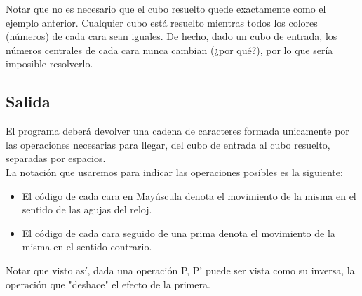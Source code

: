 \documentclass[11pt,a4paper]{article}
\begin{document}
Notar que no es necesario que el cubo resuelto quede exactamente como el ejemplo anterior. Cualquier cubo está resuelto mientras todos los colores (números) de cada cara sean iguales. 
De hecho, dado un cubo de entrada, los números centrales de cada cara nunca cambian (¿por qué?), por lo que sería imposible resolverlo. %

\subsection{Salida}
El programa deberá devolver una cadena de caracteres formada unicamente por las operaciones necesarias para llegar, del cubo de entrada al cubo resuelto, separadas por espacios.\\
La notación que usaremos para indicar las operaciones posibles es la siguiente:
\begin{itemize}
\item El código de cada cara en Mayúscula denota el movimiento de la misma en el sentido de las agujas del reloj.
\item El código de cada cara seguido de una prima denota el movimiento de la misma en el sentido contrario. 
\end{itemize}

Notar que visto así, dada una operación P, P' puede ser vista como su inversa, la operación que "deshace" el efecto de la primera.
\end{document}
